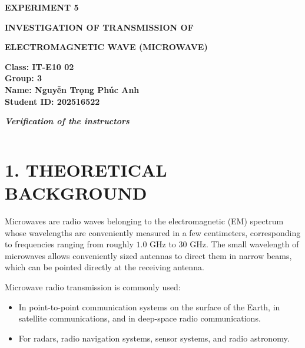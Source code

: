 \documentclass[12pt,oneside,a4paper]{article}
\theoremstyle{definition}
\begin{document}
	\renewcommand{\figurename}{Figure}
	\renewcommand{\tablename}{Table}
	
	\begin{center}
		\textbf{\Large EXPERIMENT 5}
		
		\vspace{0.5cm}
		\textbf{{\Large INVESTIGATION OF TRANSMISSION OF}}
		
		\vspace{0.1cm}
		\textbf{{\Large ELECTROMAGNETIC WAVE (MICROWAVE)}}
	\end{center}
	
	\vspace{0.5cm}
	
	\noindent
	\begin{minipage}[t]{0.5\textwidth}
		\vspace{0.5cm}
		\textbf{Class: IT-E10 02} \\[0.2cm]
		\textbf{Group: 3} \\[0.2cm]
		\textbf{Name: Nguyễn Trọng Phúc Anh} \\[0.2cm]
		\textbf{Student ID: 202516522}
	\end{minipage}%
	\begin{minipage}[t]{0.5\textwidth}
		\vspace{0pt}
		\centering
		\textit{\textbf{Verification of the instructors}} \\[0.2cm]
		\begin{tabular}{|p{3.5cm}|p{3.5cm}|}
			\hline
			& \\[2.5cm]
			\hline
		\end{tabular}
	\end{minipage}
	
	\vspace{0.8cm}
	
	\section*{1. THEORETICAL BACKGROUND}
	Microwaves are radio waves belonging to the electromagnetic (EM) spectrum whose wavelengths are conveniently measured in a few centimeters, corresponding to frequencies ranging from roughly $1.0\text{ GHz}$ to $30\text{ GHz}$. The small wavelength of microwaves allows conveniently sized antennas to direct them in narrow beams, which can be pointed directly at the receiving antenna.
	
	\vspace{0.3cm}
	\noindent
	Microwave radio transmission is commonly used:
	\begin{itemize}[leftmargin=1.5em]
		\item In point-to-point communication systems on the surface of the Earth, in satellite communications, and in deep-space radio communications.
		\item For radars, radio navigation systems, sensor systems, and radio astronomy.
	\end{itemize}
	
\end{document}
